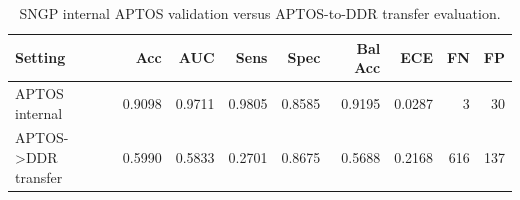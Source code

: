\begin{table}[t]
\centering
\small
\caption{SNGP internal APTOS validation versus APTOS-to-DDR transfer evaluation.}
\label{tab:sngp-transfer}
\begin{tabular}{lrrrrrrrr}
\toprule
Setting & Acc & AUC & Sens & Spec & Bal Acc & ECE & FN & FP \\
\midrule
APTOS internal & 0.9098 & 0.9711 & 0.9805 & 0.8585 & 0.9195 & 0.0287 & 3 & 30 \\
APTOS->DDR transfer & 0.5990 & 0.5833 & 0.2701 & 0.8675 & 0.5688 & 0.2168 & 616 & 137 \\
\bottomrule
\end{tabular}
\end{table}
